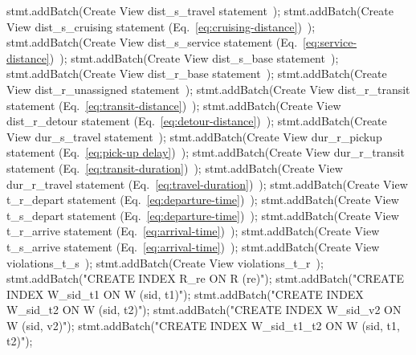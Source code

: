     stmt.addBatch(\LA{}Create View dist\_s\_travel statement~{\nwtagstyle{}}\RA{});
    stmt.addBatch(\LA{}Create View dist\_s\_cruising statement (Eq.~\ref{eq:cruising-distance})~{\nwtagstyle{}}\RA{});
    stmt.addBatch(\LA{}Create View dist\_s\_service statement (Eq.~\ref{eq:service-distance})~{\nwtagstyle{}}\RA{});
    stmt.addBatch(\LA{}Create View dist\_s\_base statement~{\nwtagstyle{}}\RA{});
    stmt.addBatch(\LA{}Create View dist\_r\_base statement~{\nwtagstyle{}}\RA{});
    stmt.addBatch(\LA{}Create View dist\_r\_unassigned statement~{\nwtagstyle{}}\RA{});
    stmt.addBatch(\LA{}Create View dist\_r\_transit statement (Eq.~\ref{eq:transit-distance})~{\nwtagstyle{}}\RA{});
    stmt.addBatch(\LA{}Create View dist\_r\_detour statement (Eq.~\ref{eq:detour-distance})~{\nwtagstyle{}}\RA{});
    stmt.addBatch(\LA{}Create View dur\_s\_travel statement~{\nwtagstyle{}}\RA{});
    stmt.addBatch(\LA{}Create View dur\_r\_pickup statement (Eq.~\ref{eq:pick-up delay})~{\nwtagstyle{}}\RA{});
    stmt.addBatch(\LA{}Create View dur\_r\_transit statement (Eq.~\ref{eq:transit-duration})~{\nwtagstyle{}}\RA{});
    stmt.addBatch(\LA{}Create View dur\_r\_travel statement (Eq.~\ref{eq:travel-duration})~{\nwtagstyle{}}\RA{});
    stmt.addBatch(\LA{}Create View t\_r\_depart statement (Eq.~\ref{eq:departure-time})~{\nwtagstyle{}}\RA{});
    stmt.addBatch(\LA{}Create View t\_s\_depart statement (Eq.~\ref{eq:departure-time})~{\nwtagstyle{}}\RA{});
    stmt.addBatch(\LA{}Create View t\_r\_arrive statement (Eq.~\ref{eq:arrival-time})~{\nwtagstyle{}}\RA{});
    stmt.addBatch(\LA{}Create View t\_s\_arrive statement (Eq.~\ref{eq:arrival-time})~{\nwtagstyle{}}\RA{});
    stmt.addBatch(\LA{}Create View violations\_t\_s~{\nwtagstyle{}}\RA{});
    stmt.addBatch(\LA{}Create View violations\_t\_r~{\nwtagstyle{}}\RA{});
    stmt.addBatch("CREATE INDEX R_re ON R (re)");
    stmt.addBatch("CREATE INDEX W_sid_t1 ON W (sid, t1)");
    stmt.addBatch("CREATE INDEX W_sid_t2 ON W (sid, t2)");
    stmt.addBatch("CREATE INDEX W_sid_v2 ON W (sid, v2)");
    stmt.addBatch("CREATE INDEX W_sid_t1_t2 ON W (sid, t1, t2)");
